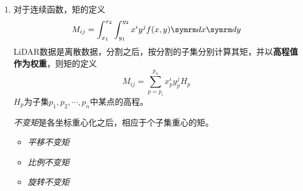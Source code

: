 \begin{enumerate}
	\item 对于连续函数，矩的定义
		\begin{equation}
		M_{ij} = \int_{x_1}^{x_2}\int_{y_1}^{y_2} x^i y^j f(x,y) \diff x \diff y
		\end{equation}
		LiDAR数据是离散数据，分割之后，按分割的子集分别计算其矩，并以\textbf{高程值作为权重}，则矩的定义
		\begin{equation}
		M_{ij} = \sum_{p=p_i}^{p_n} x_p^i y_p^j H_p
		\end{equation}
		$ H_p $为子集$ {p_1,p_2,\cdots,p_n} $中某点的高程。
		
		\textit{不变矩}是各坐标重心化之后，相应于个子集重心的矩。
			\begin{itemize}
				\item \textit{平移不变矩}
				\item \textit{比例不变矩}
				\item \textit{旋转不变矩}
			\end{itemize}
		

\end{enumerate}

